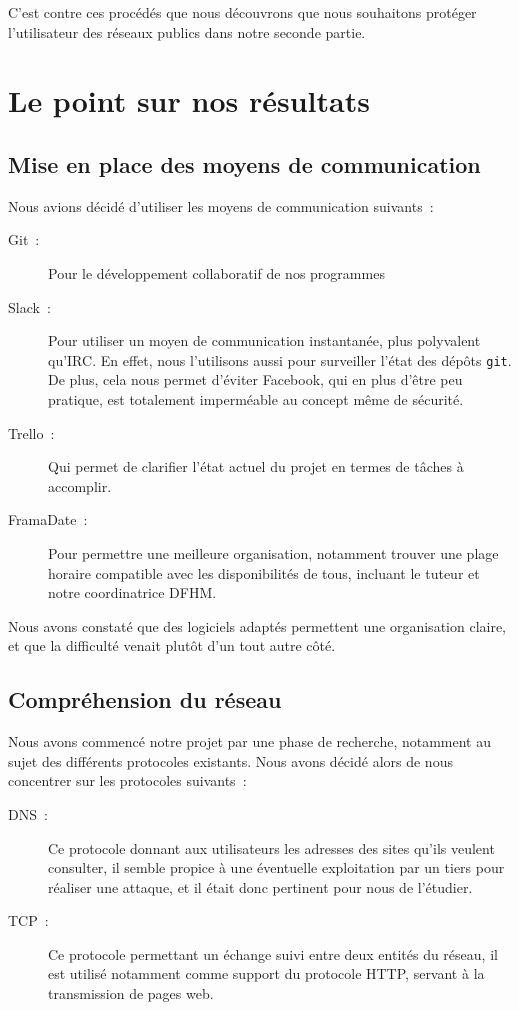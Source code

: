 \documentclass[a4paper, 12pt,twoside]{article}
\begin{document}
        C'est contre ces procédés que nous découvrons que nous souhaitons protéger l'utilisateur des réseaux publics dans notre seconde partie.

    \clearpage
    \section{Le point sur nos résultats}

        \subsection{Mise en place des moyens de communication}

            Nous avions décidé d'utiliser les moyens de communication suivants~:
            \begin{description}
                \item[Git~:] Pour le développement collaboratif de nos programmes
                \item[Slack~:] Pour utiliser un moyen de communication instantanée, plus polyvalent qu'IRC. En effet, nous l'utilisons aussi pour surveiller l'état des dépôts \verb!git!. De plus, cela nous permet d'éviter Facebook, qui en plus d'être peu pratique, est totalement imperméable au concept même de sécurité.
                \item[Trello~:] Qui permet de clarifier l'état actuel du projet en termes de tâches à accomplir.
                \item[FramaDate~:] Pour permettre une meilleure organisation, notamment trouver une plage horaire compatible avec les disponibilités de tous, incluant le tuteur et notre coordinatrice DFHM.
            \end{description}

            Nous avons constaté que des logiciels adaptés permettent une organisation claire, et que la difficulté venait plutôt d'un tout autre côté.

        \subsection{Compréhension du réseau}

            Nous avons commencé notre projet par une phase de recherche,  notamment au sujet des différents protocoles existants. Nous avons décidé alors de nous concentrer sur les protocoles suivants~:
            \begin{description}
                \item[DNS~:] Ce protocole donnant aux utilisateurs les adresses des sites qu'ils veulent consulter, il semble propice à une éventuelle exploitation par un tiers pour réaliser une attaque, et il était donc pertinent pour nous de l'étudier.
                \item[TCP~:] Ce protocole permettant un échange suivi entre deux entités du réseau, il est utilisé notamment comme support du protocole HTTP, servant à la transmission de pages web.
            \end{description}
\end{document}

